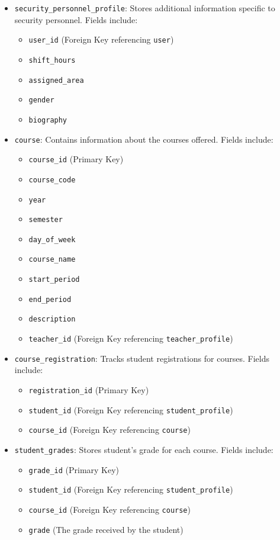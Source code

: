 \documentclass[12pt]{article}
\begin{document}
\begin{itemize}
    \clearpage  %

    \item \texttt{security\_personnel\_profile}: Stores additional information specific to security personnel. Fields include:
    \begin{itemize}
        \item \texttt{user\_id} (Foreign Key referencing \texttt{user})
        \item \texttt{shift\_hours}
        \item \texttt{assigned\_area}
        \item \texttt{gender}
        \item \texttt{biography}
    \end{itemize}


    \item \texttt{course}: Contains information about the courses offered. Fields include:
    \begin{itemize}
        \item \texttt{course\_id} (Primary Key)
        \item \texttt{course\_code}
        \item \texttt{year}
        \item \texttt{semester}
        \item \texttt{day\_of\_week}
        \item \texttt{course\_name}
        \item \texttt{start\_period}
        \item \texttt{end\_period}
        \item \texttt{description}
        \item \texttt{teacher\_id} (Foreign Key referencing \texttt{teacher\_profile})
    \end{itemize}

    \item \texttt{course\_registration}: Tracks student registrations for courses. Fields include:
    \begin{itemize}
        \item \texttt{registration\_id} (Primary Key)
        \item \texttt{student\_id} (Foreign Key referencing \texttt{student\_profile})
        \item \texttt{course\_id} (Foreign Key referencing \texttt{course})
    \end{itemize}

    \item \texttt{student\_grades}: Stores student's grade for each course. Fields include:
    \begin{itemize}
        \item \texttt{grade\_id} (Primary Key)
        \item \texttt{student\_id} (Foreign Key referencing \texttt{student\_profile})
        \item \texttt{course\_id} (Foreign Key referencing \texttt{course})
        \item \texttt{grade} (The grade received by the student)
    \end{itemize}


\end{itemize}
\end{document}
